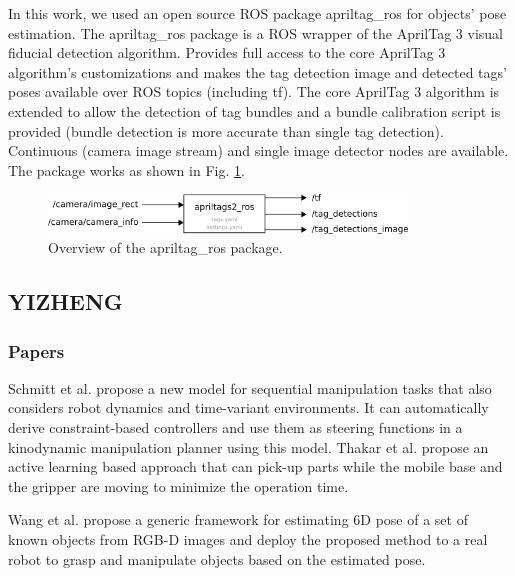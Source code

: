 \documentclass[12pt,draftclsnofoot,onecolumn]{IEEEtran}
\begin{document}
	In this work, we used an open source ROS package apriltag\_ros for objects' pose estimation. The apriltag\_ros package is a ROS wrapper of the AprilTag 3 visual fiducial detection algorithm. Provides full access to the core AprilTag 3 algorithm's customizations and makes the tag detection image and detected tags' poses available over ROS topics (including tf). The core AprilTag 3 algorithm is extended to allow the detection of tag bundles and a bundle calibration script is provided (bundle detection is more accurate than single tag detection). Continuous (camera image stream) and single image detector nodes are available. The package works as shown in Fig. \ref{apriltag}. 
	
	
	\begin{figure}[H]
		\centering
		\includegraphics[width=0.85\textwidth]{img/apriltag.png}
		\caption{
			Overview of the apriltag\_ros package.
		}
		\label{apriltag}
	\end{figure}
	
	
	\subsection{YIZHENG}
	\subsubsection{Papers}
	
	Schmitt et al.\cite{8793824} propose a new model for sequential manipulation tasks that also considers robot dynamics and time-variant environments.
	It can automatically derive constraint-based controllers and use them as steering functions in a kinodynamic manipulation planner using this model.
	Thakar et al.\cite{8793501} propose an active learning based approach that can pick-up parts while the mobile base and the gripper are moving to minimize the operation time.
	
	Wang et al.\cite{Wang_2019_CVPR} propose a generic framework for estimating 6D pose of a set of known objects from RGB-D images 
	and deploy the proposed method to a real robot to grasp and manipulate objects based on the estimated pose.
	
\end{document}

